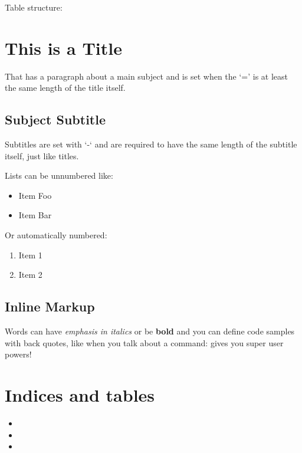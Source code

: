 \documentclass[letterpaper,10pt,english]{sphinxmanual}
\begin{document}
Table structure:


\chapter{This is a Title}
\label{_static/example copy::doc}\label{_static/example copy:this-is-a-title}
That has a paragraph about a main subject and is set when the `='
is at least the same length of the title itself.


\section{Subject Subtitle}
\label{_static/example copy:subject-subtitle}
Subtitles are set with `-` and are required to have the same length
of the subtitle itself, just like titles.

Lists can be unnumbered like:
\begin{itemize}
\item {} 
Item Foo

\item {} 
Item Bar

\end{itemize}

Or automatically numbered:
\begin{enumerate}
\item {} 
Item 1

\item {} 
Item 2

\end{enumerate}


\section{Inline Markup}
\label{_static/example copy:inline-markup}
Words can have \emph{emphasis in italics} or be \textbf{bold} and you can define
code samples with back quotes, like when you talk about a command: 
gives you super user powers!


\chapter{Indices and tables}
\label{index:indices-and-tables}\begin{itemize}
\item {} 

\item {} 

\item {} 

\end{itemize}



\renewcommand{\indexname}{Index}
\printindex
\end{document}
